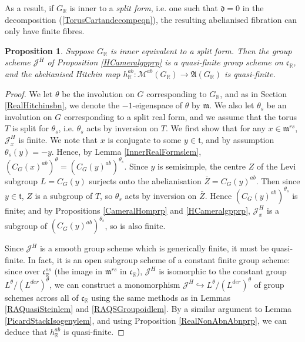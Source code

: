 \documentclass{amsart}
\newtheorem{proposition}[theorem]{Proposition}
\theoremstyle{remark}
\numberwithin{theorem}{section}
\numberwithin{equation}{section}
\begin{document}
As a result, if $G_{\mathbb{R}}$ is inner to a \emph{split form}, i.e. one such that $\mathfrak{d} = 0$ in the decomposition (\ref{TorusCartandecompeqn}), the resulting abelianised fibration can only have finite fibres. 

\begin{proposition}\label{InnerSplitFormprp}
    Suppose $G_\mathbb{R}$ is inner equivalent to a split form. Then the group scheme $\mathcal J^H$ of Proposition \ref{HCameralgpprp} is a quasi-finite group scheme on $\mathfrak{c}_\mathbb{R}$, and the abelianised Hitchin map $ h_\mathbb{R}^{ab}:\mathcal M^{ab}(G_{\mathbb{R}}) \rightarrow \mathfrak{ A}(G_{\mathbb{R}})$ is quasi-finite.
\end{proposition}

\begin{proof}
We let $\theta$ be the involution on $G$ corresponding to $G_\mathbb{R}$, and as in Section \ref{RealHitchinsbn}, we denote the $-1$-eigenspace of $\theta$ by $\mathfrak{m}$. We also let $\theta_s$ be an involution on $G$ corresponding to a split real form, and we assume that the torus $T$ is split for $\theta_s$, i.e. $\theta_s$ acts by inversion on $T$. We first show that for any $x \in \mathfrak{m}^{rs}$, $\mathcal J^H_x$ is finite. We note that $x$ is conjugate to some $y \in \mathfrak{t}$, and by assumption $\theta_s(y)=-y$. Hence, by Lemma \ref{InnerRealFormslem}, $(C_G(x)^{ab})^\theta = (C_G(y)^{ab})^{\theta_s}$. Since $y$ is semisimple, the centre $Z$ of the Levi subgroup $L = C_G(y)$ surjects onto the abelianisation $\bar{Z} = C_G(y)^{ab}$. Then since $y \in \mathfrak{t}$, $Z$ is a subgroup of $T$, so $\theta_s$ acts by inversion on $\bar{Z}$. Hence $(C_G(y)^{ab})^{\theta_s}$ is finite; and by Propositions \ref{CameralHomprp} and \ref{HCameralgpprp}, $\mathcal J^H_x$ is a subgroup of $(C_G(y)^{ab})^{\theta_s}$, so is also finite.

Since $\mathcal J^H$ is a smooth group scheme which is generically finite, it must be quasi-finite. In fact, it is an open subgroup scheme of a constant finite group scheme: since over $\mathfrak{c}_\mathbb{R}^{ss}$ (the image in $\mathfrak{m}^{rs}$ in $\mathfrak{c}_\mathbb{R}$), $\mathcal J^H$ is isomorphic to the constant group $L^\theta/(L^{der})^\theta$, we can construct a monomorphism $\mathcal J^H \hookrightarrow L^\theta/(L^{der})^\theta$ of group schemes across all of $\mathfrak{c}_\mathbb{R}$ using the same methods as in Lemmas \ref{RAQuasiSteinlem} and \ref{RAQSGroupoidlem}. By a similar argument to Lemma \ref{PicardStackIsogenylem}, and using Proposition \ref{RealNonAbnAbnprp}, we can deduce that ${ h}_{\mathbb{R}}^{ab}$ is quasi-finite.
\end{proof}
\end{document}
